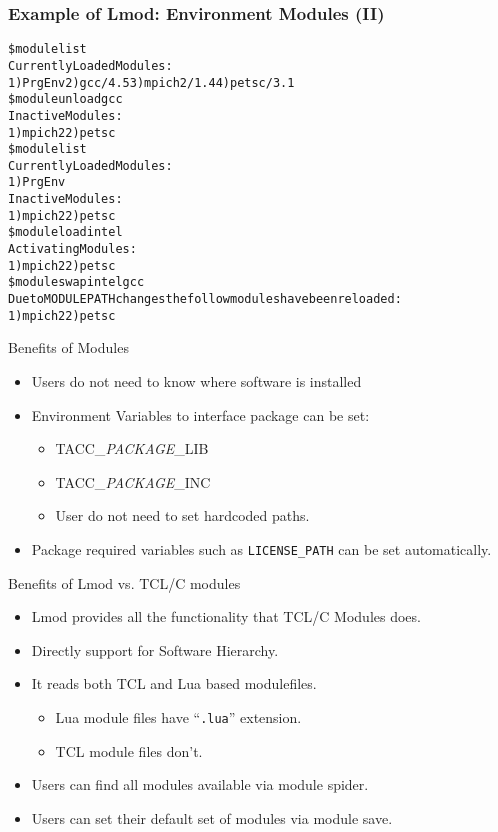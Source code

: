 \documentclass{beamer}
\begin{document}
\begin{frame}[fragile]
    \frametitle{Example of Lmod: Environment Modules (II)}
    {\tiny
\begin{alltt}
{\color{blue}\$ module list}
Currently Loaded Modules:
  1) PrgEnv  2) gcc/4.5  3) mpich2/1.4  4) petsc/3.1
{\color{blue}\$ module unload gcc}
Inactive Modules:
  1) mpich2  2) petsc
{\color{blue}\$ module list}
Currently Loaded Modules:
  1) PrgEnv
Inactive Modules:
  1) mpich2  2) petsc
{\color{blue}\$ module load intel}
Activating Modules:
  1) mpich2  2) petsc
{\color{blue}\$ module swap intel gcc}
Due to MODULEPATH changes the follow modules have been reloaded:
  1) mpich2  2) petsc
\end{alltt}
    }
\end{frame}


\begin{frame}{Benefits of Modules}
  \begin{itemize}
    \item Users do not need to know where software is installed
    \item Environment Variables to interface package can be set:
      \begin{itemize}
        \item TACC\_{\color{blue}\emph{PACKAGE}}\_LIB
        \item TACC\_{\color{blue}\emph{PACKAGE}}\_INC
        \item User do not need to set hardcoded paths.
      \end{itemize}
    \item Package required variables such as \texttt{LICENSE\_PATH}
      can be set automatically.
  \end{itemize}
\end{frame}


\begin{frame}{Benefits of Lmod vs. TCL/C modules}

  \begin{itemize}
    \item Lmod provides all the functionality that TCL/C Modules does.
    \item Directly support for Software Hierarchy.
    \item It reads both TCL and Lua based modulefiles.
      \begin{itemize}
        \item Lua module files have ``\texttt{.lua}'' extension.
        \item TCL module files don't.
      \end{itemize}
    \item Users can find all modules available via {\color{blue}module spider}.
    \item Users can set their default set of modules via
      {\color{blue}module  save}.
  \end{itemize}
\end{frame}
\end{document}
